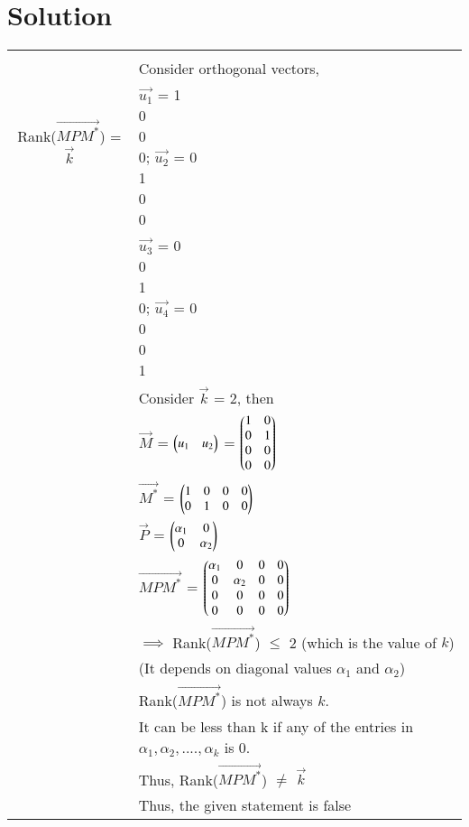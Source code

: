 \documentclass[journal,12pt]{IEEEtran}
\begin{document}
\section{\textbf{Solution}}
\renewcommand{\thetable}{2}
\begin{longtable}{|c|l|}
    \hline
	\multirow{3}{*}{Rank($\vec{MP{M}^*}$) = $\vec{k}$} 
	& \\
	& Consider orthogonal vectors,\\
	& $\vec{u_1}$ = \myvec{1\\0\\0\\0}; $\vec{u_2}$ = \myvec{0\\1\\0\\0}\\
	& $\vec{u_3}$ = \myvec{0\\0\\1\\0}; $\vec{u_4}$ = \myvec{0\\0\\0\\1}\\
	& Consider $\vec{k}$ = 2, then \\
	& $\vec{M}$ = $\begin{pmatrix}u_1&u_2\end{pmatrix}$ = $\begin{pmatrix}1&0\\0&1\\0&0\\0&0\end{pmatrix}$\\
	& $\vec{M^*}$ = $\begin{pmatrix}1&0&0&0\\0&1&0&0\end{pmatrix}$\\
	& $\vec{P}$ = $\begin{pmatrix}\alpha_1&0\\0&\alpha_2\end{pmatrix}$\\
	& $\vec{MPM^{*}}$ = $\begin{pmatrix}\alpha_1&0&0&0\\
	                       0&\alpha_2&0&0\\
	                       0&0&0&0\\
	                       0&0&0&0\end{pmatrix}$\\
	& $\implies$ Rank($\vec{MPM^{*}}$) $\le$ 2 (which is the value of $k$)\\
	& (It depends on diagonal values $\alpha_1$ and $\alpha_2$)\\
	& Rank($\vec{MPM^{*}}$) is not always $k$. \\
	& It can be less than k if any of the entries in $\alpha_1,\alpha_2,....,\alpha_k$ is 0.\\
	& Thus, Rank($\vec{MP{M}^*}$) $\ne$ $\vec{k}$\\
	& Thus, the given statement is false\\

\end{longtable}
\end{document}
